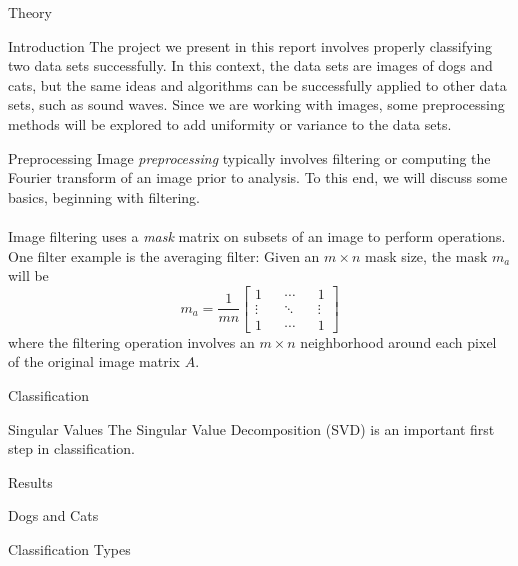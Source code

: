 \begin{section}{Theory}

\begin{homeworkSection}{Introduction}
The project we present in this report involves properly classifying two data sets successfully. In this context, the data sets are images of dogs and cats, but the same ideas and algorithms can be successfully applied to other data sets, such as sound waves. Since we are working with images, some preprocessing methods will be explored to add uniformity or variance to the data sets. 
\end{homeworkSection}

\begin{homeworkSection}{Preprocessing}
Image \textit{preprocessing} typically involves filtering or computing the Fourier transform of an image prior to analysis. To this end, we will discuss some basics, beginning with filtering. 
\\
\\
Image filtering uses a \textit{mask} matrix on subsets of an image to perform operations. One filter example is the averaging filter: Given an $m \times n$ mask size, the mask $m_a$will be
$$
	m_a = \frac{1}{mn} \begin{bmatrix} 1 && \cdots && 1 \\ \vdots && \ddots && \vdots \\ 1 && \cdots && 1 \end{bmatrix}
$$
where the filtering operation involves an $m\times n$ neighborhood around each pixel of the original image matrix $A$.

\end{homeworkSection}

\begin{homeworkSection}{Classification}

\end{homeworkSection}


\begin{homeworkSection}{Singular Values}
The Singular Value Decomposition (SVD) is an important first step in classification.
\end{homeworkSection}

\end{section}


\begin{section}{Results}
\begin{homeworkSection}{Dogs and Cats}
\end{homeworkSection}

\begin{homeworkSection}{Classification Types}

\end{homeworkSection}


\end{section}

